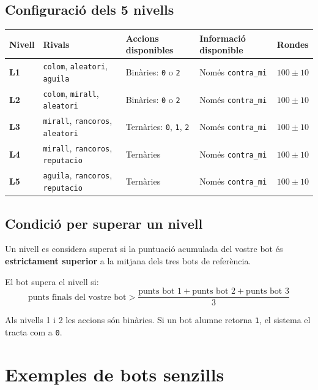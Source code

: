 \documentclass[12pt,a4paper]{report}
\begin{document}
\section{Configuració dels 5 nivells}

\begin{center}
\begin{tabularx}{\textwidth}{>{\bfseries}l Y Y Y Y}
\toprule
Nivell & Rivals & Accions disponibles & Informació disponible & Rondes \\
\midrule
L1 & \texttt{colom}, \texttt{aleatori}, \texttt{aguila} & Binàries: \texttt{0} o \texttt{2} & Només \texttt{contra\_mi} & \(100 \pm 10\) \\
L2 & \texttt{colom}, \texttt{mirall}, \texttt{aleatori} & Binàries: \texttt{0} o \texttt{2} & Només \texttt{contra\_mi} & \(100 \pm 10\) \\
L3 & \texttt{mirall}, \texttt{rancoros}, \texttt{aleatori} & Ternàries: \texttt{0}, \texttt{1}, \texttt{2} & Només \texttt{contra\_mi} & \(100 \pm 10\) \\
L4 & \texttt{mirall}, \texttt{rancoros}, \texttt{reputacio} & Ternàries & Només \texttt{contra\_mi} & \(100 \pm 10\) \\
L5 & \texttt{aguila}, \texttt{rancoros}, \texttt{reputacio} & Ternàries & Només \texttt{contra\_mi} & \(100 \pm 10\) \\
\bottomrule
\end{tabularx}
\end{center}

\section{Condició per superar un nivell}

Un nivell es considera superat si la puntuació acumulada del vostre bot és
\textbf{estrictament superior} a la mitjana dels tres bots de referència.

\begin{tcolorbox}[colback=softblue,colframe=upcblue,title=Condició formal]
El bot supera el nivell si:
\[
\text{punts finals del vostre bot}
>
\frac{\text{punts bot 1} + \text{punts bot 2} + \text{punts bot 3}}{3}
\]
\end{tcolorbox}

Als nivells 1 i 2 les accions són binàries. Si un bot alumne retorna \texttt{1},
el sistema el tracta com a \texttt{0}.

\chapter{Exemples de bots senzills}
\end{document}
